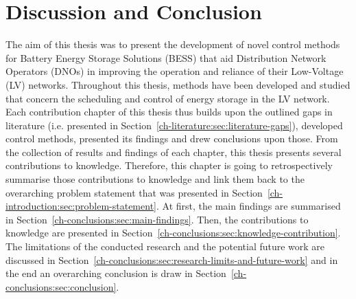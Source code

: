 \chapter{Discussion and Conclusion}
\label{ch-conclusions}

The aim of this thesis was to present the development of novel control methods for Battery Energy Storage Solutions (BESS) that aid Distribution Network Operators (DNOs) in improving the operation and reliance of their Low-Voltage (LV) networks.
Throughout this thesis, methods have been developed and studied that concern the scheduling and control of energy storage in the LV network.
Each contribution chapter of this thesis thus builds upon the outlined gaps in literature (i.e. presented in Section~\ref{ch-literature:sec:literature-gaps}), developed control methods, presented its findings and drew conclusions upon those.
From the collection of results and findings of each chapter, this thesis presents several contributions to knowledge.
Therefore, this chapter is going to retrospectively summarise those contributions to knowledge and link them back to the overarching problem statement that was presented in Section~\ref{ch-introduction:sec:problem-statement}.
At first, the main findings are summarised in Section~\ref{ch-conclusions:sec:main-findings}.
Then, the contributions to knowledge are presented in Section~\ref{ch-conclusions:sec:knowledge-contribution}.
The limitations of the conducted research and the potential future work are discussed in Section~\ref{ch-conclusions:sec:research-limits-and-future-work} and in the end an overarching conclusion is draw in Section~\ref{ch-conclusions:sec:conclusion}.










